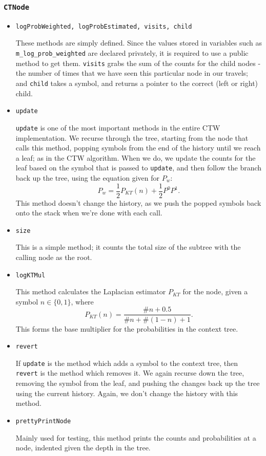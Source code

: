 \documentclass[pdftex,twoside,a4paper]{report}
\begin{document}
\subsubsection{\texttt{CTNode}}
\begin{itemize}
\item{\texttt{logProbWeighted, logProbEstimated, visits, child}

    These methods are simply defined. Since the values stored in variables such as \texttt{m\_log\_prob\_weighted} are declared privately, it is required to use a public method to get them. \texttt{visits} grabs the sum of the counts for the child nodes - the number of times that we have seen this particular node in our travels; and \texttt{child} takes a symbol, and returns a pointer to the correct (left or right) child.
  }
\item{\texttt{update}

    \texttt{update} is one of the most important methods in the entire CTW implementation. We recurse through the tree, starting from the node that calls this method, popping symbols from the end of the history until we reach a leaf; as in the CTW algorithm. When we do, we update the counts for the leaf based on the symbol that is passed to \texttt{update}, and then follow the branch back up the tree, using the equation given for $P_{w}$: \[ P_{w} = \frac{1}{2}P_{KT}(n) + \frac{1}{2}P^{0}P^{1}. \] %
This method doesn't change the history, as we push the popped symbols back onto the stack when we're done with each call.
  }
\item{\texttt{size}
    
    This is a simple method; it counts the total size of the subtree with the calling node as the root. 
  }
\item{\texttt{logKTMul}
    
    This method calculates the Laplacian estimator $P_{KT}$ for the node, given a symbol $n \in \{0,1\}$, where \[ P_{KT}(n) = \frac{\#n + 0.5}{\#n + \#(1-n) + 1}.\] This forms the base multiplier for the probabilities in the context tree.
  }
\item{\texttt{revert}
    
    If \texttt{update} is the method which adds a symbol to the context tree, then \texttt{revert} is the method which removes it. We again recurse down the tree, removing the symbol from the leaf, and pushing the changes back up the tree using the current history. Again, we don't change the history with this method.
  }
\item{\texttt{prettyPrintNode}
    
    Mainly used for testing, this method prints the counts and probabilities at a node, indented given the depth in the tree.
  }
\end{itemize}
\end{document}
